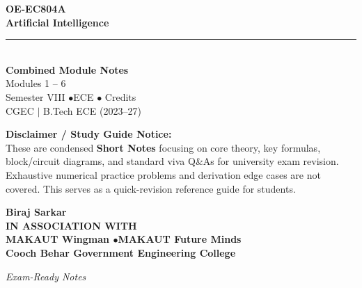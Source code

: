 \documentclass[12pt,a4paper]{article}
\begin{document}
\thispagestyle{empty}


\vspace*{1.0cm}
\begin{center}
  {\Huge\bfseries\color{myred} OE-EC804A}\\[10pt]
  {\LARGE\bfseries\color{mydark} Artificial Intelligence}\\[20pt]
  {\color{myred}\rule{0.7\linewidth}{1.5pt}}\\[18pt]
  {\Large\color{myteal}\textbf{Combined Module Notes}}\\[8pt]
  {\large\color{mydark} Modules 1 -- 6}\\[40pt]
  {\normalsize\color{mydark} Semester VIII \quad$\bullet$\quad ECE \quad$\bullet$ Credits}\\[12pt]
  {\normalsize\color{mydark} CGEC \;$|$\; B.Tech ECE (2023--27)}
\end{center}
\vspace{1.0cm}
\begin{center}
  \begin{tcolorbox}[colback=mygray, colframe=mgframe, boxrule=0.5pt, arc=3pt, width=0.85\linewidth]
    \centering\small\color{mydark}
    \textbf{Disclaimer / Study Guide Notice:}\\
    These are condensed \textbf{Short Notes} focusing on core theory, key formulas, block/circuit diagrams, and standard viva Q\&As for university exam revision. Exhaustive numerical practice problems and derivation edge cases are not covered. This serves as a quick-revision reference guide for students.
  \end{tcolorbox}
\end{center}
\vfill
\vspace{0.6cm}
\begin{center}
  {\large\bfseries\color{mypurple} Biraj Sarkar}\\[16pt]
  {\footnotesize\color{watermark}\textbf{IN ASSOCIATION WITH}}\\[8pt]
  {\small\bfseries\color{mydark} MAKAUT Wingman \quad$\bullet$\quad MAKAUT Future Minds}\\[12pt]
  {\large\bfseries\color{myteal} Cooch Behar Government Engineering College}
\end{center}
\vfill
\begin{center}{\small\color{watermark}\textit{Exam-Ready Notes}}\end{center}
\clearpage
\end{document}
